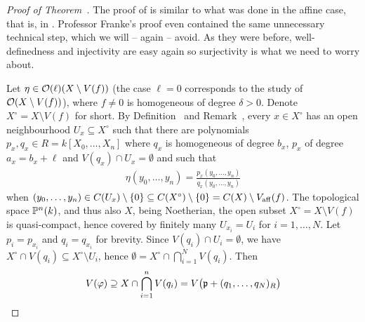 \documentclass[a4paper,parskip=half,numbers=enddot, DIV=12, headheight=30pt]{scrreprt}
\begin{document}
\begin{proof}[Proof of Theorem~]
    The proof of  is similar to what was done in the affine case, that is, in \cite[Proposition~2.2.2]{alg1}. Professor Franke's proof even contained the same unnecessary technical step, which we will -- again -- avoid. As they were before, well-definedness and injectivity are easy again so surjectivity is what we need to worry about. 
    
    Let $\eta\in \mathcal{O}(\ell)(X\setminus V(f))$ (the case $\ell=0$ corresponds to the study of $\mathcal{O}(X\setminus V(f))$), where $f\neq 0$ is homogeneous of degree $\delta >0$. Denote $X^\circ=X\setminus V(f)$ for short. By Definition~ and Remark~, every $x\in X^\circ$ has an open neighbourhood $U_x\subseteq X^\circ$ such that there are polynomials $p_x,q_x\in R=k[X_0,\ldots, X_n]$ where $q_x$ is homogeneous of degree $b_x$, $p_x$ of degree $a_x = b_x+\ell$ and $V(q_x)\cap U_x = \emptyset$ and such that 
    \begin{align*}
        \eta(y_0,\ldots, y_n) = \frac{p_x(y_0,\ldots, y_n)}{q_x(y_0,\ldots, y_n)}
    \end{align*}
    when $(y_0,\ldots, y_n)\in C(U_x)\setminus\{0\}\subseteq C(X^\circ)\setminus \{0\}=C(X)\setminus V_{\mathrm{aff}}(f)$. The topological space $\mathbb{P}^n(k)$, and thus also $X$, being Noetherian, the open subset $X^\circ=X\setminus V(f)$ is quasi-compact, hence covered by finitely many $U_{x_i}=U_i$ for $i=1,\ldots, N$. Let $p_i=p_{x_i}$ and $q_i=q_{x_i}$ for brevity. Since $V(q_i)\cap U_i=\emptyset$, we have $X^\circ\cap V(q_i)\subseteq X^\circ\setminus U_i$, hence $\emptyset=X^\circ\cap\bigcap_{i=1}^NV(q_i)$.
    Then 
    \begin{align*}
        V(\phi) \supseteq X\cap \bigcap_{i=1}^n V(q_i) = V\big(\pp+ (q_1,\ldots, q_N)_R\big)

\end{align*}
\end{proof}
\end{document}
